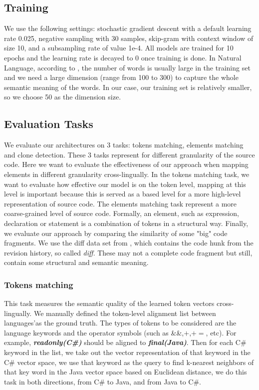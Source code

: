 \subsection{Training}
We use the following settings: stochastic gradient descent with a default learning rate 0.025, negative sampling with 30 samples, skip-gram with context window of size 10, and a subsampling rate of value 1e-4. All models are trained for 10 epochs and the learning rate is decayed to 0 once training is done. In Natural Language, according to \cite{pennington2014glove}, the number of words is usually large in the training set and we need a large dimension (range from 100 to 300) to capture the whole semantic meaning of the words. In our case, our training set is relatively smaller, so we choose 50 as the dimension size.
\subsection{Evaluation Tasks}
We evaluate our architectures on 3 tasks: tokens matching, elements matching and clone detection. These 3 tasks represent for different granularity of the source code. Here we want to evaluate the effectiveness of our approach when mapping elements in different granularity cross-lingually. In the tokens matching task, we want to evaluate how effective our model is on the token level, mapping at this level is important because this is served as a based level for a more high-level representation of source code. The elements matching task represent a more coarse-grained level of source code. Formally, an element, such as expression, declaration or statement is a combination of tokens in a structural way. Finally, we evaluate our approach by comparing the similarity of some "big" code fragments. We use the diff data set from \cite{cheng2017clcminer}, which contains the code hunk from the revision history, so called \textit{diff}. These may not a complete code fragment but still, contain some structural and semantic meaning.
\subsubsection{Tokens matching}
This task measures the semantic quality of the learned token vectors cross-lingually.  We manually defined the token-level alignment list between languages'as the ground truth. The types of tokens to be considered are the language keywords and the operator symbols (such as \&\&,$+$,$+=$, etc). For example, \textbf{\textit{readonly(C\#)}} should be aligned to \textbf{\textit{final(Java)}}. Then for each C\# keyword in the list, we take out the vector representation of that keyword in the C\# vector space, we use that keyword as the query to find k-nearest neighbors of that key word in the Java vector space based on Euclidean distance, we do this task in both directions, from C\# to Java, and from Java to C\#. 

